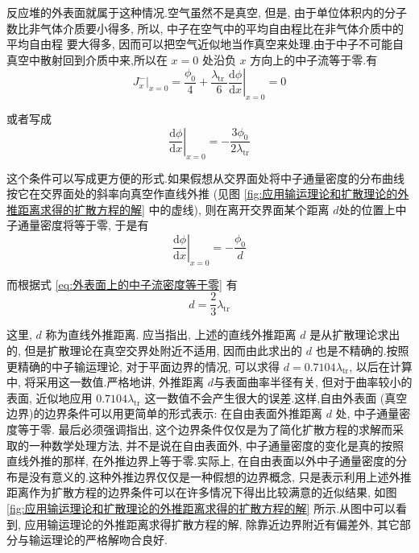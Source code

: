 \documentclass{Sichuan Normal University}
\begin{document}
\begin{itemize}
反应堆的外表面就属于这种情况.空气虽然不是真空, 但是, 由于单位体积内的分子数比非气体介质要小得多, 所以, 中子在空气中的平均自由程比在非气体介质中的平均自由程
要大得多, 因而可以把空气近似地当作真空来处理.由于中子不可能自真空中散射回到介质中来,所以在 $x=0$ 处沿负 $x$ 方向上的中子流等于零.有
\begin{equation}
\left.J_x^{-}\right|_{x=0}=\frac{\phi_0}{4}+\left.\frac{\lambda_{\text {tr }}}{6} \frac{\mathrm{d} \phi}{\mathrm{d} x}\right|_{x=0}=0
\end{equation}

或者写成
\begin{equation}
\left.\frac{\mathrm{d} \phi}{\mathrm{d} x}\right|_{x=0}=-\frac{3 \phi_0}{2 \lambda_{\mathrm{tr}}}
\label{eq:外表面上的中子流密度等于零}
\end{equation}

这个条件可以写成更方便的形式.如果假想从交界面处将中子通量密度的分布曲线按它在交界面处的斜率向真空作直线外推 (见图 \ref{fig:应用输运理论和扩散理论的外推距离求得的扩散方程的解} 中的虚线), 则在离开交界面某个距离 $d$处的位置上中子通量密度将等于零, 于是有
\begin{equation}
\left.\frac{\mathrm{d} \phi}{\mathrm{d} x}\right|_{x=0}=-\frac{\phi_0}{d}
\end{equation}

而根据式 \eqref{eq:外表面上的中子流密度等于零} 有
\begin{equation}
d=\frac{2}{3} \lambda_{\mathrm{tr}}
\end{equation}

这里, $d$ 称为直线外推距离.
应当指出, 上述的直线外推距离 $d$ 是从扩散理论求出的, 但是扩散理论在真空交界处附近不适用, 因而由此求出的 $d$ 也是不精确的.按照更精确的中子输运理论, 对于平面边界的情况, 可以求得 $d=0.7104 \lambda_{\mathrm{tr}}$, 以后在计算中, 将采用这一数值.严格地讲, 外推距离 $d$与表面曲率半径有关, 但对于曲率较小的表面, 近似地应用 $0.7104 \lambda_{\mathrm{tr}}$ 这一数值不会产生很大的误差.这样,自由外表面 (真空边界)的边界条件可以用更简单的形式表示:
在自由表面外推距离 $d$ 处, 中子通量密度等于零.
最后必须强调指出, 这个边界条件仅仅是为了简化扩散方程的求解而采取的一种数学处理方法, 并不是说在自由表面外, 中子通量密度的变化是真的按照直线外推的那样, 在外推边界上等于零.实际上, 在自由表面以外中子通量密度的分布是没有意义的.这种外推边界仅仅是一种假想的边界概念, 只是表示利用上述外推距离作为扩散方程的边界条件可以在许多情况下得出比较满意的近似结果, 如图 \ref{fig:应用输运理论和扩散理论的外推距离求得的扩散方程的解} 所示.从图中可以看到, 应用输运理论的外推距离求得扩散方程的解, 除靠近边界附近有偏差外, 其它部分与输运理论的严格解吻合良好.



\end{itemize}
\end{document}
